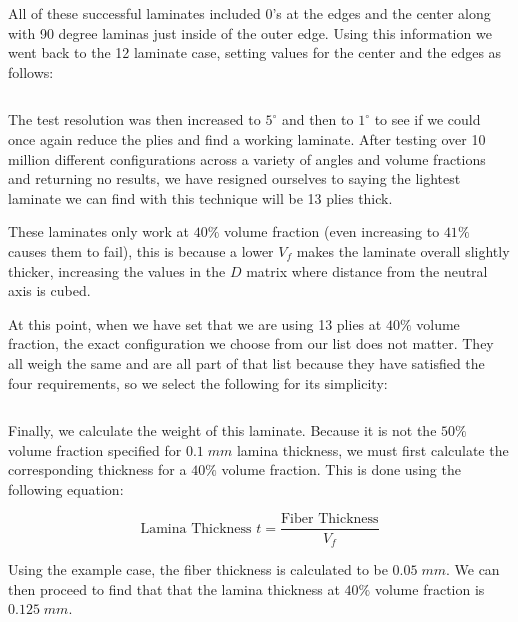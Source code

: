 \documentclass[12pt]{article}
\begin{document}
All of these successful laminates included 0's at the edges and the center along with 90 degree laminas just inside of the outer edge. Using this information we went back to the 12 laminate case, setting values for the center and the edges as follows:

\begin{equation*}
    [0/90/\theta _1 / \theta_2/\theta_3/ 0/\theta_3/\theta_2/\theta_1/90/0]
\end{equation*}

The test resolution was then increased to $5^\circ$ and then to $1^\circ$ to see if we could once again reduce the plies and find a working laminate. After testing over 10 million different configurations across a variety of angles and volume fractions and returning no results, we have resigned ourselves to saying the lightest laminate we can find with this technique will be 13 plies thick.

These laminates only work at $40\%$ volume fraction (even increasing to $41\%$ causes them to fail), this is because a lower $V_f$ makes the laminate overall slightly thicker, increasing the values in the $D$ matrix where distance from the neutral axis is cubed. 

At this point, when we have set that we are using 13 plies at $40\%$ volume fraction, the exact configuration we choose from our list does not matter. They all weigh the same and are all part of that list because they have satisfied the four requirements, so we select the following for its simplicity:

\begin{equation*}
    [0   / 90   /  0  /  75  /   0  /   0   /  0  /   0  /   0  /  75  /   0 /   90  /   0]
\end{equation*}

Finally, we calculate the weight of this laminate. Because it is not the $50 \%$ volume fraction specified for $0.1\;mm$ lamina thickness, we must first calculate the corresponding thickness for a $40 \% $ volume fraction. This is done using the following equation:

\begin{equation}
    \text{Lamina Thickness }t =  \frac{\text{Fiber Thickness}}{V_f}
    \label{eq:tv}
\end{equation}

Using the example case, the fiber thickness is calculated to be $0.05\;mm$. We can then proceed to find that that the lamina thickness at $40 \%$ volume fraction is $0.125\;mm$. 
\end{document}
